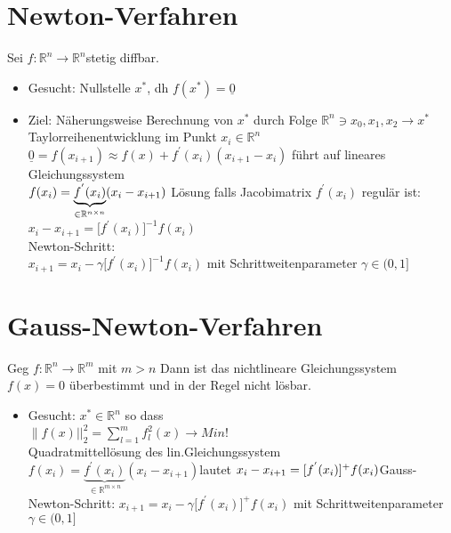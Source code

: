 \documentclass[ngerman]{tudscrreprt}
\begin{document}
\section{Newton-Verfahren}
Sei $f: \mathbb{R}^n \rightarrow \mathbb{R}^n $stetig diffbar.\\
\begin{itemize}
\item Gesucht: Nullstelle $x^*$, dh $f(x^*) = \underline{0}$ 
\item Ziel: Näherungsweise Berechnung von $x^*$ durch Folge $\mathbb{R}^n \ni x_0 , x_1,x_2 \rightarrow x^*$\\
Taylorreihenentwicklung im Punkt $x_i \in \mathbb{R}^n$\\
$
\underline 0 = f(x_{i+1}) \approx f(x) + f^{'}(x_i)(x_{i+1} - x_i) 
$ führt auf lineares Gleichungssystem \\
$
f(x_i) = \underbrace{ f^{'}(x_i)}_{\in \mathbb{R}^{n\times n}} (x_i - x_{i+1})\\
$
Lösung falls Jacobimatrix $f^{'}(x_i)$ regulär ist:\\
$
x_i - x_{i+1} =  \Big[ f^{'}(x_i)\Big]^{-1}f(x_i) 
$\\
Newton-Schritt:\\
$
x_{i+1} = x_i - \gamma \Big[ f^{'}(x_i)\Big]^{-1} f(x_i)
$ mit Schrittweitenparameter $\gamma \in (0,1]$
\end{itemize}
\section{Gauss-Newton-Verfahren}
Geg $f: \mathbb{R}^n \rightarrow \mathbb{R}^m$ mit $m>n$ Dann ist das nichtlineare Gleichungssystem $f(x) = 0$ überbestimmt und in der Regel nicht lösbar.\\
\begin{itemize}
\item Gesucht: $x^* \in \mathbb{R}^n$ so dass \\
$
\left\|f(x)|\right|_2^2 = \sum \limits_{l=1}^{m} f_l^2(x)\rightarrow Min!
$\\
Quadratmittellösung des lin.Gleichungssystem\\
$
f(x_i) = \underbrace{f^{'}(x_i)}_{\in \mathbb{R}^{m\times n}}(x_i - x_{i+1})
$lautet $ 
x_i - x_{i+1} = [f^{'}(x_i)]^+ f(x_i)\\
$Gauss-Newton-Schritt: $ 
x_{i+1} = x_i - \gamma \Big[ f^{'}(x_i)\Big]^{+} f(x_i)
$ mit Schrittweitenparameter $\gamma \in (0,1]$
\end{itemize}
\end{document}
